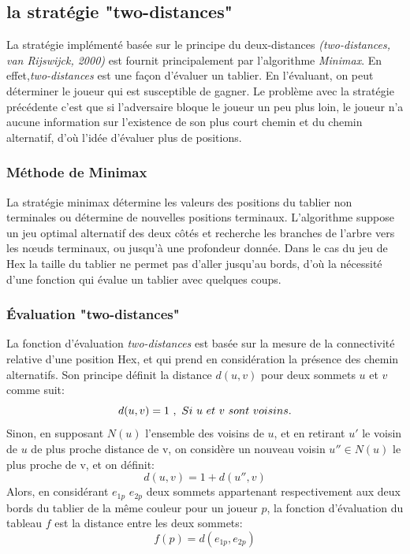 \subsection{la stratégie "two-distances"}
La stratégie implémenté basée sur le principe du deux-distances \textit{(two-distances, van Rijswijck, 2000)} est fournit principalement par l'algorithme \textit{Minimax}. En effet,\textit{two-distances} est une façon d'évaluer un tablier. En l'évaluant, on peut déterminer le joueur qui est susceptible de gagner. Le problème avec la stratégie précédente c'est que si l'adversaire bloque le joueur un peu plus loin, le joueur n'a aucune information sur l'existence de son plus court chemin et du chemin alternatif, d'où l'idée d'évaluer plus de positions.
\subsubsection{Méthode de Minimax}
La stratégie minimax détermine les valeurs des positions du tablier non terminales ou détermine de nouvelles positions terminaux. L'algorithme suppose un jeu optimal alternatif des deux côtés et recherche les branches de l'arbre vers les nœuds terminaux, ou  jusqu'à une profondeur donnée. Dans le cas du jeu de Hex la taille du tablier ne permet pas d'aller jusqu'au bords, d'où la nécessité d'une fonction qui évalue un tablier avec quelques coups. 
\subsubsection{Évaluation "two-distances"}
La fonction d'évaluation \textit{two-distances} est basée sur la mesure de la connectivité relative d'une position Hex, et qui prend en considération la présence des chemin alternatifs. Son principe définit la distance $d(u,v)$ pour deux sommets $u$ et $v$ comme suit:
\begin{equation}
    d(u,v) = 1\ ,\ Si\ u\ et\ v\ sont\ voisins. \\
\end{equation}
Sinon, en supposant $N(u)$ l'ensemble des voisins de $u$, et en retirant $u'$ le voisin de $u$ de plus proche distance de v, on considère un nouveau voisin $u'' \in N(u)$ le plus proche de v, et on définit:
\begin{equation}
    d(u,v) = 1 + d(u'',v)
\end{equation}
Alors, en considérant $e_{1p}$ $e_{2p}$ deux sommets appartenant respectivement aux deux bords du tablier de la même couleur pour un joueur $p$, la fonction d'évaluation du tableau $f$ est la distance entre les deux sommets: \\
\begin{equation}
    f(p) = d(e_{1p},e_{2p})
\end{equation}

